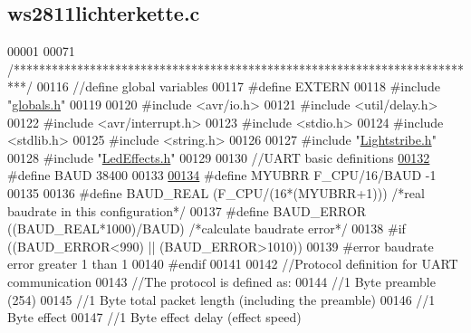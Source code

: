 \hypertarget{ws2811lichterkette_8c_source}{}\subsection{ws2811lichterkette.\+c}

\begin{DoxyCode}
00001 
00071 \textcolor{comment}{/**************************************************************************/}
00116 \textcolor{comment}{//define global variables}
00117 \textcolor{preprocessor}{#define EXTERN}
00118 \textcolor{preprocessor}{#include "\hyperlink{globals_8h}{globals.h}"}
00119 
00120 \textcolor{preprocessor}{#include <avr/io.h>}
00121 \textcolor{preprocessor}{#include <util/delay.h>}
00122 \textcolor{preprocessor}{#include <avr/interrupt.h>}
00123 \textcolor{preprocessor}{#include <stdio.h>}      
00124 \textcolor{preprocessor}{#include <stdlib.h>}    
00125 \textcolor{preprocessor}{#include <string.h>}
00126 
00127 \textcolor{preprocessor}{#include "\hyperlink{_lightstribe_8h}{Lightstribe.h}"}
00128 \textcolor{preprocessor}{#include "\hyperlink{_led_effects_8h}{LedEffects.h}"}
00129 
00130 \textcolor{comment}{//UART basic definitions}
\hypertarget{ws2811lichterkette_8c_source_l00132}{}\hyperlink{ws2811lichterkette_8c_a62634036639f88eece6fbf226b45f84b}{00132} \textcolor{comment}{}\textcolor{preprocessor}{#define BAUD 38400  }
00133 
\hypertarget{ws2811lichterkette_8c_source_l00134}{}\hyperlink{ws2811lichterkette_8c_a711e9130c825a7269c8c87dbb57a85e0}{00134} \textcolor{preprocessor}{#define MYUBRR F\_CPU/16/BAUD -1}
00135 
00136 \textcolor{preprocessor}{#define BAUD\_REAL (F\_CPU/(16*(MYUBRR+1)))       }\textcolor{comment}{/*real baudrate in this configuration*/}\textcolor{preprocessor}{}
00137 \textcolor{preprocessor}{#define BAUD\_ERROR ((BAUD\_REAL*1000)/BAUD)      }\textcolor{comment}{/*calculate baudrate error*/}\textcolor{preprocessor}{    }
00138 \textcolor{preprocessor}{#if ((BAUD\_ERROR<990) || (BAUD\_ERROR>1010))}
00139 \textcolor{preprocessor}{    #error baudrate error greater 1%
       than 1%
00140 \textcolor{preprocessor}{#endif}
00141 
00142 \textcolor{comment}{//Protocol definition for UART communication}
00143 \textcolor{comment}{//The protocol is defined as:}
00144 \textcolor{comment}{//1 Byte preamble (254)}
00145 \textcolor{comment}{//1 Byte total packet length (including the preamble)}
00146 \textcolor{comment}{//1 Byte effect}
00147 \textcolor{comment}{//1 Byte effect delay (effect speed)}
}
\end{DoxyCode}
